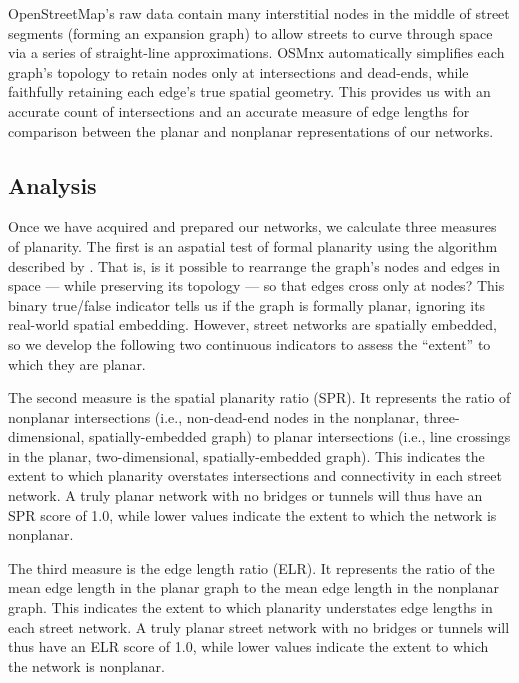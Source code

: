 \documentclass[Afour,sageh,times]{sagej}
\begin{document}
OpenStreetMap's raw data contain many interstitial nodes in the middle of street segments (forming an expansion graph) to allow streets to curve through space via a series of straight-line approximations. OSMnx automatically simplifies each graph's topology to retain nodes only at intersections and dead-ends, while faithfully retaining each edge's true spatial geometry. This provides us with an accurate count of intersections and an accurate measure of edge lengths for comparison between the planar and nonplanar representations of our networks.

\subsection{Analysis}

Once we have acquired and prepared our networks, we calculate three measures of planarity. The first is an aspatial test of formal planarity using the algorithm described by \citet{boyer_subgraph_2012}. That is, is it possible to rearrange the graph's nodes and edges in space --- while preserving its topology --- so that edges cross only at nodes? This binary true/false indicator tells us if the graph is formally planar, ignoring its real-world spatial embedding. However, street networks are spatially embedded, so we develop the following two continuous indicators to assess the \enquote{extent} to which they are planar.

The second measure is the spatial planarity ratio (SPR). It represents the ratio of nonplanar intersections (i.e., non-dead-end nodes in the nonplanar, three-dimensional, spatially-embedded graph) to planar intersections (i.e., line crossings in the planar, two-dimensional, spatially-embedded graph). This indicates the extent to which planarity overstates intersections and connectivity in each street network. A truly planar network with no bridges or tunnels will thus have an SPR score of 1.0, while lower values indicate the extent to which the network is nonplanar.

The third measure is the edge length ratio (ELR). It represents the ratio of the mean edge length in the planar graph to the mean edge length in the nonplanar graph. This indicates the extent to which planarity understates edge lengths in each street network. A truly planar street network with no bridges or tunnels will thus have an ELR score of 1.0, while lower values indicate the extent to which the network is nonplanar.
\end{document}
